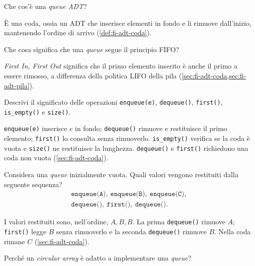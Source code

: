 \begin{exercise}
\label{ex:fi-esercizi-strutture-dati-queue-definizione}
Che cos'è una \emph{queue ADT}?
\end{exercise}

È una coda, ossia un ADT che inserisce elementi in fondo e li rimuove
dall'inizio, mantenendo l'ordine di arrivo (\cref{def:fi-adt-coda}).

\clearpage

\begin{exercise}
\label{ex:fi-esercizi-strutture-dati-queue-fifo}
Che cosa significa che una \emph{queue} segue il principio FIFO?
\end{exercise}

\emph{First In, First Out} significa che il primo elemento inserito è anche il
primo a essere rimosso, a differenza della politica LIFO della pila
(\cref{sec:fi-adt-coda,sec:fi-adt-pila}).

\begin{exercise}
\label{ex:fi-esercizi-strutture-dati-queue-operazioni}
Descrivi il significato delle operazioni \texttt{enqueue(e)},
\texttt{dequeue()}, \texttt{first()}, \texttt{is\_empty()} e \texttt{size()}.
\end{exercise}

\texttt{enqueue(e)} inserisce \(e\) in fondo; \texttt{dequeue()} rimuove e
restituisce il primo elemento; \texttt{first()} lo consulta senza rimuoverlo.
\texttt{is\_empty()} verifica se la coda è vuota e \texttt{size()} ne
restituisce la lunghezza. \texttt{dequeue()} e \texttt{first()} richiedono una
coda non vuota (\cref{sec:fi-adt-coda}).

\begin{exercise}
\label{ex:fi-esercizi-strutture-dati-queue-traccia}
Considera una \emph{queue} inizialmente vuota. Quali valori vengono restituiti
dalla seguente sequenza?
\[
\begin{gathered}
  \texttt{enqueue(A)},\ \texttt{enqueue(B)},\ \texttt{enqueue(C)},\\
  \texttt{dequeue()},\ \texttt{first()},\ \texttt{dequeue()}.
\end{gathered}
\]
\end{exercise}

I valori restituiti sono, nell'ordine, \(A,B,B\). La prima \texttt{dequeue()}
rimuove \(A\); \texttt{first()} legge \(B\) senza rimuoverlo e la seconda
\texttt{dequeue()} rimuove \(B\). Nella coda rimane \(C\)
(\cref{sec:fi-adt-coda}).

\begin{exercise}
\label{ex:fi-esercizi-strutture-dati-queue-circular-array}
Perché un \emph{circular array} è adatto a implementare una \emph{queue}?
\end{exercise}

